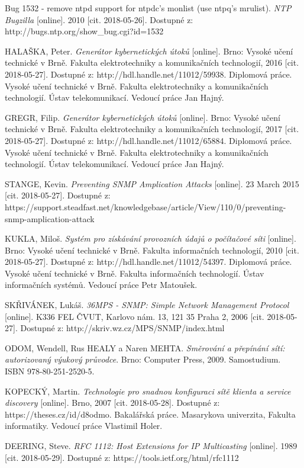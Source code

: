 \begin{literatura}{99}
Bug 1532 - remove ntpd support for ntpdc's monlist (use ntpq's mrulist). \textit{NTP Bugzilla} [online]. 2010 [cit. 2018-05-26]. Dostupné z: http://bugs.ntp.org/show\_bug.cgi?id=1532

HALAŠKA, Peter. \textit{Generátor kybernetických útoků} [online]. Brno: Vysoké učení technické v Brně. Fakulta elektrotechniky a komunikačních technologií, 2016 [cit. 2018-05-27]. Dostupné z: http://hdl.handle.net/11012/59938. Diplomová práce. Vysoké učení technické v Brně. Fakulta elektrotechniky a komunikačních technologií. Ústav telekomunikací. Vedoucí práce Jan Hajný.

GREGR, Filip. \textit{Generátor kybernetických útoků} [online]. Brno: Vysoké učení technické v Brně. Fakulta elektrotechniky a komunikačních technologií, 2017 [cit. 2018-05-27]. Dostupné z: http://hdl.handle.net/11012/65884. Diplomová práce. Vysoké učení technické v Brně. Fakulta elektrotechniky a komunikačních technologií. Ústav telekomunikací. Vedoucí práce Jan Hajný.

STANGE, Kevin. \textit{Preventing SNMP Amplication Attacks} [online]. 23 March 2015 [cit. 2018-05-27]. Dostupné z: https://support.steadfast.net/knowledgebase/article/View/110/0/preventing-snmp-amplication-attack

KUKLA, Miloš. \textit{Systém pro získávání provozních údajů o počítačové síti} [online]. Brno: Vysoké učení technické v Brně. Fakulta informačních technologií, 2010 [cit. 2018-05-27]. Dostupné z: http://hdl.handle.net/11012/54397. Diplomová práce. Vysoké učení technické v Brně. Fakulta informačních technologií. Ústav informačních systémů. Vedoucí práce Petr Matoušek.

SKŘIVÁNEK, Lukáš. \textit{36MPS - SNMP: Simple Network Management Protocol} [online]. K336 FEL ČVUT, Karlovo nám. 13, 121 35 Praha 2, 2006 [cit. 2018-05-27]. Dostupné z: http://skriv.wz.cz/MPS/SNMP/index.html

ODOM, Wendell, Rus HEALY a Naren MEHTA. \textit{Směrování a přepínání sítí: autorizovaný výukový průvodce}. Brno: Computer Press, 2009. Samostudium. ISBN 978-80-251-2520-5.

KOPECKÝ, Martin. \textit{Technologie pro snadnou konfiguraci sítě klienta a service discovery} [online]. Brno, 2007 [cit. 2018-05-28]. Dostupné z: https://theses.cz/id/d8odmo. Bakalářská práce. Masarykova univerzita, Fakulta informatiky. Vedoucí práce Vlastimil Holer.

DEERING, Steve. \textit{RFC 1112: Host Extensions for IP Multicasting} [online]. 1989 [cit. 2018-05-29]. Dostupné z: https://tools.ietf.org/html/rfc1112

\end{literatura}



